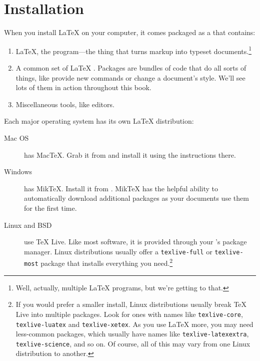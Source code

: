 \chapter{Installation}
\label{installation}

When you install \LaTeX{} on your computer, it comes packaged as a
 that contains:
\begin{enumerate}
\item \LaTeX, the program---the thing that turns markup into
    typeset documents.\footnote{Well, actually, multiple \LaTeX{} programs,
    but we're getting to that.}
\item A common set of \LaTeX{} .
    Packages are bundles of code that do all sorts of things,
    like provide new commands or change a document's style.
    We'll see lots of them in action throughout this book.
\item Miscellaneous tools, like editors.
\end{enumerate}
Each major operating system has its own \LaTeX{} distribution:
\begin{description}
\item[Mac OS] has Mac\TeX. Grab it from 
    and install it using the instructions there.

\item[Windows] has Mik\TeX.
    Install it from .
    Mik\TeX{} has the helpful ability to automatically download
    additional packages as your documents use them for the first time.

\item[Linux and BSD] use \TeX{} Live.
    Like most software, it is provided through your
    's package manager.
    Linux distributions usually offer a \texttt{texlive-\allowbreak full}
    or \texttt{texlive-\allowbreak most} package that installs everything
    you need.\punckern\footnote{%
    If you would prefer a smaller install,
    Linux distributions usually break \TeX{} Live into multiple packages.
    Look for ones with names like
    \texttt{texlive-\allowbreak core}, \texttt{texlive-\allowbreak luatex}
    and \texttt{texlive-\allowbreak xetex}.
    As you use \LaTeX{} more, you may need less-common packages,
    which usually have names like \texttt{texlive-\allowbreak latexextra},
    \texttt{texlive-\allowbreak science}, and so on.
    Of course, all of this may vary from one Linux distribution to another.}
\end{description}

